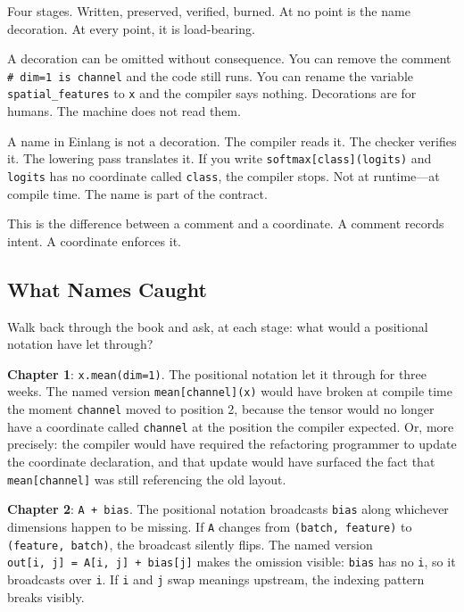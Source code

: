 \documentclass[11pt,titlepage]{article}
\begin{document}
Four stages. Written, preserved, verified, burned. At no point is the
name decoration. At every point, it is load-bearing.

A decoration can be omitted without consequence. You can remove the
comment \texttt{\#\ dim=1\ is\ channel} and the code still runs. You can
rename the variable \texttt{spatial\_features} to \texttt{x} and the
compiler says nothing. Decorations are for humans. The machine does not
read them.

A name in Einlang is not a decoration. The compiler reads it. The
checker verifies it. The lowering pass translates it. If you write
\texttt{softmax{[}class{]}(logits)} and \texttt{logits} has no
coordinate called \texttt{class}, the compiler stops. Not at
runtime---at compile time. The name is part of the contract.

This is the difference between a comment and a coordinate. A comment
records intent. A coordinate enforces it.

\vspace{2em}

\hypertarget{what-names-caught}{%
\subsection{What Names Caught}\label{what-names-caught}}

Walk back through the book and ask, at each stage: what would a
positional notation have let through?

\textbf{Chapter 1}: \texttt{x.mean(dim=1)}. The positional notation let
it through for three weeks. The named version
\texttt{mean{[}channel{]}(x)} would have broken at compile time the
moment \texttt{channel} moved to position 2, because the tensor would no
longer have a coordinate called \texttt{channel} at the position the
compiler expected. Or, more precisely: the compiler would have required
the refactoring programmer to update the coordinate declaration, and
that update would have surfaced the fact that \texttt{mean{[}channel{]}}
was still referencing the old layout.

\textbf{Chapter 2}: \texttt{A\ +\ bias}. The positional notation
broadcasts \texttt{bias} along whichever dimensions happen to be
missing. If \texttt{A} changes from \texttt{(batch,\ feature)} to
\texttt{(feature,\ batch)}, the broadcast silently flips. The named
version \texttt{out{[}i,\ j{]}\ =\ A{[}i,\ j{]}\ +\ bias{[}j{]}} makes
the omission visible: \texttt{bias} has no \texttt{i}, so it broadcasts
over \texttt{i}. If \texttt{i} and \texttt{j} swap meanings upstream,
the indexing pattern breaks visibly.
\end{document}
